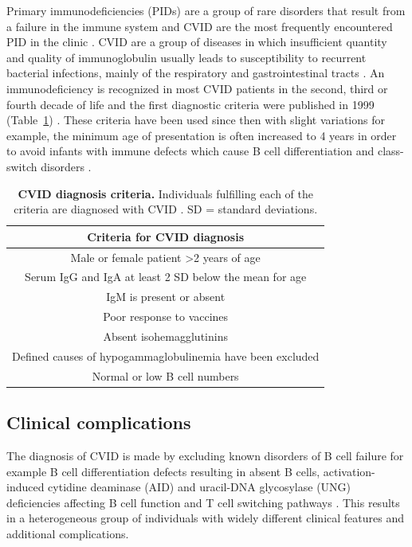Primary immunodeficiencies (PIDs) are a group of rare disorders that result from a failure in the immune system and CVID are the most frequently encountered PID in the clinic \parencite{Park2008}. CVID are a group of diseases in which insufficient quantity and quality of immunoglobulin usually leads to susceptibility to recurrent bacterial infections, mainly of the respiratory and gastrointestinal tracts \parencite{Chapel2009}.  An immunodeficiency is recognized in most CVID patients in the second, third or fourth decade of life and the first diagnostic criteria were published in 1999 (Table~\ref{tab:criteria.cvid}) \parencite{Conley1999}.  These criteria have been used since then with slight variations for example, the minimum age of presentation is often increased to 4 years in order to avoid infants with immune defects which cause B cell differentiation and class-switch disorders \parencite{Chapel2008}.

\begin{table}[H]
\centering
\singlespacing
\caption[CVID diagnosis criteria]{\textbf{CVID diagnosis criteria.} Individuals fulfilling each of the criteria are diagnosed with CVID \parencite{Conley1999}. SD = standard deviations.}  
\label{tab:criteria.cvid}
\begin{tabular}{c}
\toprule
\textbf{Criteria for CVID diagnosis} \\ 
\midrule
Male or female patient \textgreater 2 years of age\\
Serum IgG and IgA at least 2 SD below the mean for age \\
IgM is present or absent\\
Poor response to vaccines \\
Absent isohemagglutinins \\
Defined causes of hypogammaglobulinemia have been excluded \\
Normal or low B cell numbers \\
\bottomrule
\end{tabular}
\end{table} 

\subsection{Clinical complications}
The diagnosis of CVID is made by excluding known disorders of B cell failure for example B cell differentiation defects resulting in absent B cells, activation-induced cytidine deaminase (AID) and uracil-DNA glycosylase (UNG) deficiencies affecting B cell function and T cell switching pathways \parencite{Chapel2008}. This results in a heterogeneous group of individuals with widely different clinical features and additional complications.

